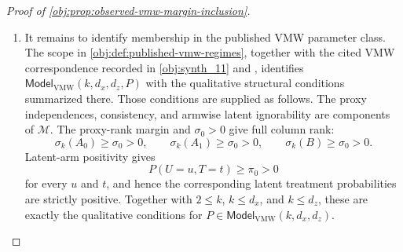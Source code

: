 \documentclass[11pt]{article}
\begin{document}
\begin{proof}[Proof of \cref{obj:prop:observed-vmw-margin-inclusion}]
\begin{enumerate}
\item It remains to identify membership in the published VMW parameter class.  The scope in \cref{obj:def:published-vmw-regimes}, together with the cited VMW correspondence recorded in \cref{obj:synth_11} and \citep{VirkMazaheriWu2026}, identifies \(\mathsf{Model}_{\mathrm{VMW}}(k,d_x,d_z,P)\) with the qualitative structural conditions summarized there.  Those conditions are supplied as follows.  The proxy independences, consistency, and armwise latent ignorability are components of \(\mathcal M\).  The proxy-rank margin and \(\sigma_0>0\) give full column rank:
\[
\sigma_k(A_0)\ge\sigma_0>0,\qquad
\sigma_k(A_1)\ge\sigma_0>0,\qquad
\sigma_k(B)\ge\sigma_0>0.
\]
Latent-arm positivity gives
\[
P(U=u,T=t)\ge\pi_0>0
\]
for every \(u\) and \(t\), and hence the corresponding latent treatment probabilities are strictly positive.  Together with \(2\le k\), \(k\le d_x\), and \(k\le d_z\), these are exactly the qualitative conditions for \(P\in\mathsf{Model}_{\mathrm{VMW}}(k,d_x,d_z)\).
\end{enumerate}
\end{proof}
\end{document}
